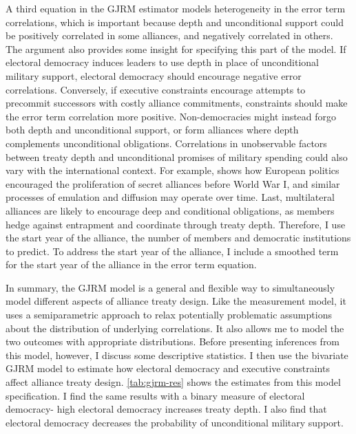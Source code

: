 \documentclass[12pt]{article}
\begin{document}
A third equation in the GJRM estimator models heterogeneity in the error term correlations, which is important because depth and unconditional support could be positively correlated in some alliances, and negatively correlated in others. 
The argument also provides some insight for specifying this part of the model.  
If electoral democracy induces leaders to use depth in place of unconditional military support, electoral democracy should encourage negative error correlations. 
Conversely, if executive constraints encourage attempts to precommit successors with costly alliance commitments, constraints should make the error term correlation more positive.
Non-democracies might instead forgo both depth and unconditional support, or form alliances where depth complements unconditional obligations. 
Correlations in unobservable factors between treaty depth and unconditional promises of military spending could also vary with the international context.
For example, \citet{Kuo2019} shows how European politics encouraged the proliferation of secret alliances before World War I, and similar processes of emulation and diffusion may operate over time.
Last, multilateral alliances are likely to encourage deep and conditional obligations, as members hedge against entrapment and coordinate through treaty depth. 
Therefore, I use the start year of the alliance, the number of members and democratic institutions to predict.
To address the start year of the alliance, I include a smoothed term for the start year of the alliance in the error term equation.  


In summary, the GJRM model is a general and flexible way to simultaneously model different aspects of alliance treaty design.
Like the measurement model, it uses a semiparametric approach to relax potentially problematic assumptions about the distribution of underlying correlations. 
It also allows me to model the two outcomes with appropriate distributions. 
Before presenting inferences from this model, however, I discuss some descriptive statistics. 
I then use the bivariate GJRM model to estimate how electoral democracy and executive constraints affect alliance treaty design.
\autoref{tab:gjrm-res} shows the estimates from this model specification. 
I find the same results with a binary measure of electoral democracy- high electoral democracy increases treaty depth.
I also find that electoral democracy decreases the probability of unconditional military support. 
\end{document}
